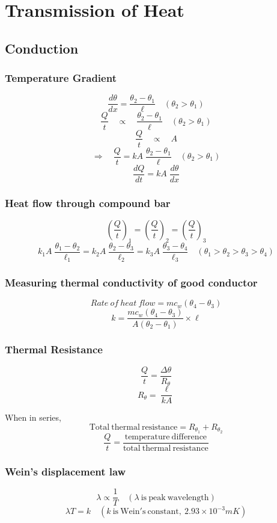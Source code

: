 \documentclass{article}
\begin{document}
\section{Transmission of Heat}
\subsection*{Conduction}

\subsubsection*{Temperature Gradient}
\[\frac{d\theta}{dx}=\frac{\theta_2-\theta_1}{\ell}\quad (\theta_2>\theta_1)\]
\[\frac{Q}{t}\quad \propto \quad \frac{\theta_2-\theta_1}{\ell}\quad (\theta_2>\theta_1)\]
\[\frac{Q}{t}\quad \propto \quad A\]
\[\Rightarrow\quad \frac{Q}{t}=kA\;\frac{\theta_2-\theta_1}{\ell}\quad (\theta_2>\theta_1)\]
\[\frac{dQ}{dt}=kA\;\frac{d\theta}{dx}\]

\subsubsection*{Heat flow through compound bar}
\[\left(\frac{Q}{t}\right)_1=\left(\frac{Q}{t}\right)_2=\left(\frac{Q}{t}\right)_3\]
\[k_1A\;\frac{\theta_1-\theta_2}{\ell_1}=k_2A\;\frac{\theta_2-\theta_3}{\ell_2}=k_3A\;\frac{\theta_3-\theta_4}{\ell_3}\quad (\theta_1>\theta_2>\theta_3>\theta_4)\]

\subsubsection*{Measuring thermal conductivity of good conductor}
\[Rate\ of\ heat\ flow = mc_w(\theta_4-\theta_3)\]
\[k=\frac{mc_w(\theta_4-\theta_3)}{A(\theta_2-\theta_1)}\times \ell\]

\subsubsection*{Thermal Resistance}
\[\frac{Q}{t}=\frac{\Delta \theta}{R_\theta}\]
\[R_\theta=\frac{\ell}{kA}\]

When in series, 
\[\mathrm{Total\ thermal\ resistance}=R_{\theta_1}+R_{\theta_2}\]
\[\frac{Q}{t}=\frac{\mathrm{temperature\ difference}}{\mathrm{total\ thermal\ resistance}}\]

\subsubsection*{Wein's displacement law}
\[\lambda \propto \frac{1}{T}\quad (\lambda \mathrm{\ is\ peak\ wavelength})\]
\[\lambda T=k \quad (k\ \mathrm{is\ Wein's\ constant,\ }2.93\times10^{-3}mK)\]
\end{document}
